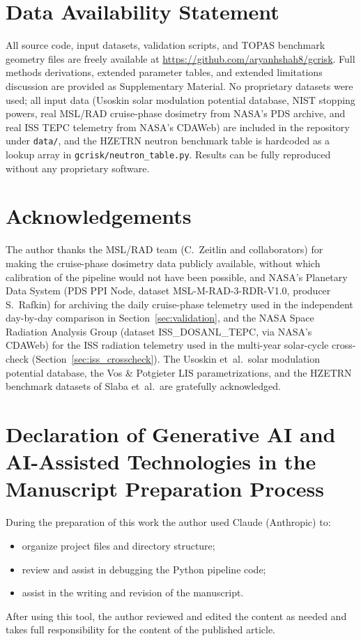 \documentclass[a4paper,fleqn]{cas-dc}
\newcommand{\code}[1]{\texttt{#1}}
\begin{document}
\section*{Data Availability Statement}

All source code, input datasets, validation scripts, and TOPAS benchmark
geometry files are freely available at
\url{https://github.com/aryanhshah8/gcrisk}.
Full methods derivations, extended parameter tables, and extended
limitations discussion are provided as Supplementary Material.
No proprietary datasets were used; all input data (Usoskin solar
modulation potential database, NIST stopping powers, real MSL/RAD
cruise-phase dosimetry from NASA's PDS archive, and real ISS TEPC
telemetry from NASA's CDAWeb) are included in the repository under
\code{data/}, and the HZETRN neutron benchmark table is hardcoded as a
lookup array in \code{gcrisk/neutron\_table.py}.
Results can be fully reproduced without any proprietary software.

\section*{Acknowledgements}

The author thanks the MSL/RAD team (C.~Zeitlin and collaborators) for making
the cruise-phase dosimetry data publicly available, without which calibration
of the pipeline would not have been possible, and NASA's Planetary Data
System (PDS PPI Node, dataset MSL-M-RAD-3-RDR-V1.0, producer S.~Rafkin) for
archiving the daily cruise-phase telemetry used in the independent
day-by-day comparison in Section~\ref{sec:validation}, and the NASA Space
Radiation Analysis Group (dataset ISS\_DOSANL\_TEPC, via NASA's CDAWeb)
for the ISS radiation telemetry used in the multi-year solar-cycle
cross-check (Section~\ref{sec:iss_crosscheck}).
The Usoskin et~al.\ solar modulation potential database, the Vos \&
Potgieter LIS parametrizations, and the HZETRN benchmark datasets of
Slaba et~al.\ are gratefully acknowledged.

\section*{Declaration of Generative AI and AI-Assisted
Technologies in the
Manuscript Preparation Process}

During the preparation of this work the author used Claude (Anthropic) to:
\begin{itemize}
  \item organize project files and directory structure;
  \item review and assist in debugging the Python pipeline code;
  \item assist in the writing and revision of the manuscript.
\end{itemize}
After using this tool, the author reviewed and edited the content as needed
and takes full responsibility for the content of the published article.

\printcredits



\end{document}
